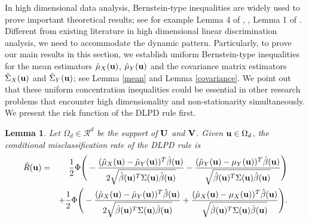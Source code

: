 \documentclass[11pt]{article}
\newtheorem{lem}{Lemma}
\theoremstyle{definition}
\begin{document}
 In high dimensional data analysis, Bernstein-type inequalities are widely used
 to prove important theoretical results; see for example Lemma 4 of
 \cite{Bickel2004}, \cite{Merl}, Lemma 1 of \cite{Cai}. Different from
 existing literature in high dimensional linear discrimination analysis, we need to accommodate the dynamic pattern. Particularly, to prove our main results in this section, we establish uniform Bernstein-type inequalities for the mean estimators $\hat{\mu}_X({\bf u})$,  $\hat{\mu}_Y({\bf u})$ and the covariance matrix estimators $\hat{\Sigma}_X({\bf u})$ and $\hat{\Sigma}_Y({\bf u})$; see Lemma \ref{mean} and Lemma \ref{covariance}. We point out that these uniform concentration inequalities could be essential in other research problems that encounter high dimensionality and non-stationarity simultaneously. We present the risk function of the DLPD rule first.
 \begin{lem}\label{risk}
 	Let $\Omega_d\in {\mathcal R}^d$ be the support of ${\bf U}$ and ${\bf V}$.
 	Given ${\bf u}\in \Omega_d$, the conditional misclassification rate of the DLPD rule is
 	\begin{eqnarray*}
 		\hat{R}({\bf u})&=&\frac{1}{2}\Phi\Bigg(-\frac{(\hat{\mu}_X({\bf u})-\hat{\mu}_Y({\bf u}))^T\hat{\beta}({\bf u})}{2\sqrt{\hat{\beta}({\bf u})^T\Sigma({\bf u})\hat{\beta}({\bf u})}}-\frac{(\hat{\mu}_Y({\bf u})-\mu_Y({\bf u}))^T\hat{\beta}({\bf u})}{\sqrt{\hat{\beta}({\bf u})^T\Sigma({\bf u})\hat{\beta}({\bf u})}}\Bigg)\\&&
 		+
 		\frac{1}{2}\Phi\Bigg(-\frac{(\hat{\mu}_X({\bf u})-\hat{\mu}_Y({\bf u}))^T\hat{\beta}({\bf u})}{2\sqrt{\hat{\beta}({\bf u})^T\Sigma({\bf u})\hat{\beta}({\bf u})}}+\frac{(\hat{\mu}_X({\bf u})-\mu_X({\bf u}))^T\hat{\beta}({\bf u})}{\sqrt{\hat{\beta}({\bf u})^T\Sigma({\bf u})\hat{\beta}({\bf u})}}\Bigg).
 	\end{eqnarray*}
 \end{lem}
 
\end{document}
